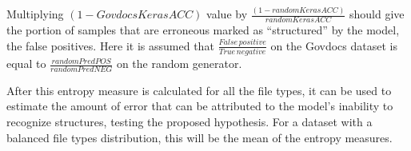 Multiplying $(1-GovdocsKerasACC)$ value by $\frac{(1-randomKerasACC)}{randomKerasACC}$ should give the portion of samples that are erroneous marked as ``structured'' by the model, the false positives. Here it is assumed that $\frac{False\, positive}{True\,negative}$ on the Govdocs dataset is equal to $\frac{randomPredPOS}{randomPredNEG}$ on the random generator.

After this entropy measure is calculated for all the file types, it can be used to estimate the amount of error that can be attributed to the model's inability to recognize structures, testing the proposed hypothesis. For a dataset with a balanced file types distribution, this will be the mean of the entropy measures.
